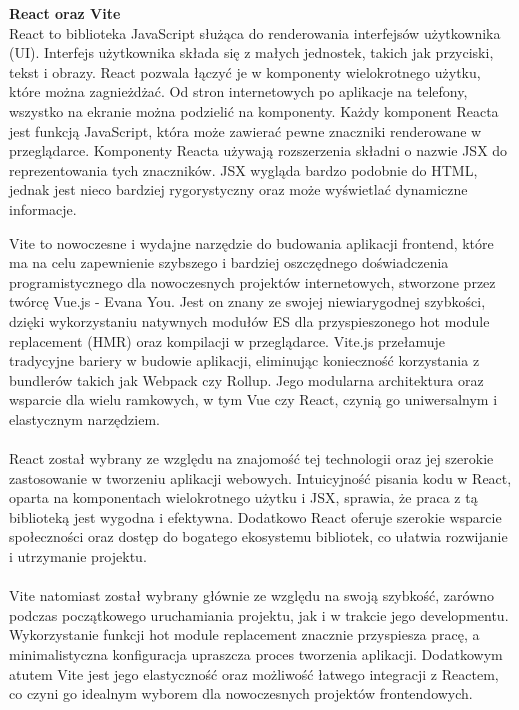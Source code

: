 \documentclass[12pt,a4paper]{article}
\begin{document}
\noindent \textbf{React oraz Vite}\\
React to biblioteka JavaScript służąca do renderowania interfejsów użytkownika (UI). Interfejs użytkownika składa się z małych jednostek, takich jak przyciski, tekst i obrazy. React pozwala łączyć je w komponenty wielokrotnego użytku, które można zagnieżdżać. Od stron internetowych po aplikacje na telefony, wszystko na ekranie można podzielić na komponenty. Każdy komponent Reacta jest funkcją JavaScript, która może zawierać pewne znaczniki renderowane w przeglądarce. Komponenty Reacta używają rozszerzenia składni o nazwie JSX do reprezentowania tych znaczników. JSX wygląda bardzo podobnie do HTML, jednak jest nieco bardziej rygorystyczny oraz może wyświetlać dynamiczne informacje. 

\newpage

\noindent
Vite to nowoczesne i wydajne  narzędzie do budowania aplikacji frontend, które ma na celu zapewnienie szybszego i bardziej oszczędnego doświadczenia programistycznego dla nowoczesnych projektów internetowych, stworzone przez twórcę Vue.js - Evana You. Jest on znany ze swojej niewiarygodnej szybkości, dzięki wykorzystaniu natywnych modułów ES dla przyspieszonego hot module replacement (HMR) oraz kompilacji w przeglądarce. Vite.js przełamuje tradycyjne bariery w budowie aplikacji, eliminując konieczność korzystania z bundlerów takich jak Webpack czy Rollup. Jego modularna architektura oraz wsparcie dla wielu ramkowych, w tym Vue czy React, czynią go uniwersalnym i elastycznym narzędziem.
\\\\
React został wybrany ze względu na znajomość tej technologii oraz jej szerokie zastosowanie w tworzeniu aplikacji webowych. Intuicyjność pisania kodu w React, oparta na komponentach wielokrotnego użytku i JSX, sprawia, że praca z tą biblioteką jest wygodna i efektywna. Dodatkowo React oferuje szerokie wsparcie społeczności oraz dostęp do bogatego ekosystemu bibliotek, co ułatwia rozwijanie i utrzymanie projektu.
\\\\
Vite natomiast został wybrany głównie ze względu na swoją szybkość, zarówno podczas początkowego uruchamiania projektu, jak i w trakcie jego developmentu. Wykorzystanie funkcji hot module replacement znacznie przyspiesza pracę, a minimalistyczna konfiguracja upraszcza proces tworzenia aplikacji. Dodatkowym atutem Vite jest jego elastyczność oraz możliwość łatwego integracji z Reactem, co czyni go idealnym wyborem dla nowoczesnych projektów frontendowych.
\\\\
\end{document}
